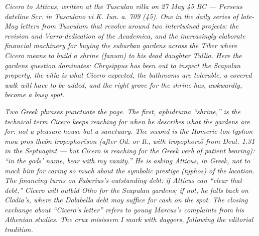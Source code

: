 
\textit{Cicero to Atticus, written at the Tusculan villa on 27 May 45
BC --- Perseus dateline \textit{Scr. in Tusculano vi K. Iun. a. 709
(45)}. One in the daily series of late-May letters from Tusculum
that revolve around two intertwined projects: the revision and
Varro-dedication of the \textit{Academica}, and the increasingly
elaborate financial machinery for buying the suburban gardens
across the Tiber where Cicero means to build a shrine
(\textit{fanum}) to his dead daughter Tullia. Here the gardens
question dominates: Chrysippus has been out to inspect the
Scapulan property, the villa is what Cicero expected, the
bathrooms are tolerable, a covered walk will have to be added, and
the right grove for the shrine has, awkwardly, become a busy
spot.}

\textit{Two Greek phrases punctuate the page. The first,
\textit{aphidruma} ``shrine,'' is the technical term Cicero keeps
reaching for when he describes what the gardens are for: not a
pleasure-house but a sanctuary. The second is the Homeric
\textit{ton typhon mou pros theōn tropophorēson} (after
\textit{Od.} or \textit{Il.}, with \textit{tropophoreō} from
Deut. 1.31 in the Septuagint --- but Cicero is reaching for the
Greek verb of patient bearing): ``in the gods' name, bear with
my vanity.'' He is asking Atticus, in Greek, not to mock him for
caring so much about the symbolic prestige (\textit{typhos}) of
the location. The financing turns on Faberius's outstanding debt:
if Atticus can ``clear that debt,'' Cicero will outbid Otho for
the Scapulan gardens; if not, he falls back on Clodia's, where
the Dolabella debt may suffice for cash on the spot. The closing
exchange about ``Cicero's letter'' refers to young Marcus's
complaints from his Athenian studies. The crux \textit{misissem}
I mark with daggers, following the editorial tradition.}
